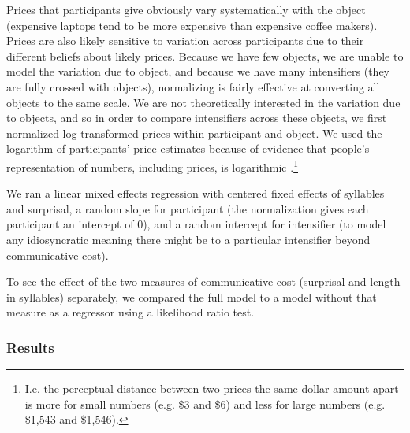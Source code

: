\documentclass[10pt,letterpaper]{article}
\begin{document}
Prices that participants give obviously vary systematically with the object (expensive laptops tend to be more expensive than expensive coffee makers).
Prices are also likely sensitive to variation across participants due to their different beliefs about likely prices.
Because we have few objects, we are unable to model the variation due to object, and because we have many intensifiers (they are fully crossed with objects), normalizing is fairly effective at converting all objects to the same scale.
We are not theoretically interested in the variation due to objects, and so in order to compare intensifiers across these objects, we first normalized log-transformed prices within participant and object.
We used the logarithm of participants' price estimates because of evidence that people's representation of numbers, including prices, is logarithmic \cite{fechner_elements_1860}.\footnote{
  I.e. the perceptual distance between two prices the same dollar amount apart is more for small numbers (e.g. \$3 and \$6) and less for large numbers (e.g. \$1,543 and \$1,546).
}

We ran a linear mixed effects regression with centered fixed effects of syllables and surprisal, a random slope for participant (the normalization gives each participant an intercept of 0), and a random intercept for intensifier (to model any idiosyncratic meaning there might be to a particular intensifier beyond communicative cost).

To see the effect of the two measures of communicative cost (surprisal and length in syllables) separately, we compared the full model to a model without that measure as a regressor using a likelihood ratio test.

\subsubsection{Results}
\end{document}
